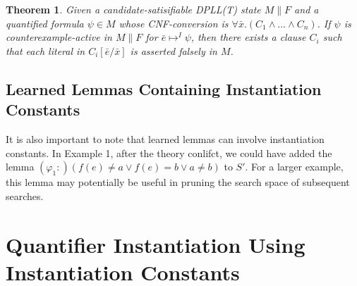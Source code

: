 \documentclass{llncs}
\newtheorem{thm}{Theorem}
\begin{document}
\begin{thm}
\label{thm:cerep}
Given a candidate-satisifiable DPLL(T) state $M \parallel F$ and a quantified formula $\psi \in M$ whose CNF-conversion is $\forall \bar{x}. (C_1 \wedge \ldots \wedge C_n)$.
If $\psi$ is counterexample-active in $M \parallel F$ for $\bar{e} \mapsto^I \psi$, then there exists a clause $C_i$ such that each literal in $C_i[ \bar{e}/\bar{x}]$ is asserted falsely in $M$.
\end{thm}

\subsection{Learned Lemmas Containing Instantiation Constants}

It is also important to note that learned lemmas can involve instantiation constants.
In Example 1, after the theory conlifct, we could have added the lemma $(\varphi_1 : ) ( f( e ) \neq a \vee f( e ) = b \vee a \neq b )$ to $S'$.
For a larger example, this lemma may potentially be useful in pruning the search space of subsequent searches.

\begin{comment}
It is also important to note that learned lemmas can involve instantiation constants.
In this example, after the theory conlifct, we could have added the lemma $(\varphi_1 : ) ( f( e ) \neq a \vee f( e ) = b \vee a \neq b )$ to $S'$.
In this case, we may apply Decide to come to the state $( a = b ), \psi, (\bot^{\neg \psi}), (f( e ) \neq a)^d \parallel S' \cup \varphi$, where again all clauses are satisfied, and the solver answers SAT in the same manner.

However, note that the lemma $\varphi_1$ is only useful in contexts in which $\psi$ is asserted.
In other words, the solver should not be searching for values of counterexamples to quantified formulas $\psi$ when $\psi$ is not asserted.
We will see in Section~\ref{sec:implementation} a recommended implementation for which this concern is addressed.
[do this: do these lemmas pollute the DPLL(T) space?  When should we forget them?  Should we give them to minisat?]
[do this: examine elaborating lemmas involving instantiation constants as being lemmas involving universal statements, justify as well]
\end{comment}

\section{Quantifier Instantiation Using Instantiation Constants}
\end{document}
